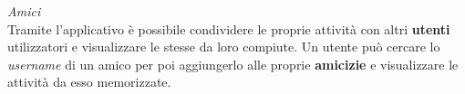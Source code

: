 \documentclass{article}
\begin{document}
    \begin{center}
        \begin{figure}[H]
            \centering
        \end{figure}
    \end{center}
    \textit{Amici} \\
    Tramite l'applicativo è possibile condividere le proprie attività con altri \textbf{utenti} utilizzatori e visualizzare le stesse da loro compiute. Un utente può cercare lo \textit{username} di un amico per poi aggiungerlo alle proprie \textbf{amicizie} e visualizzare le attività da esso memorizzate.
\end{document}
